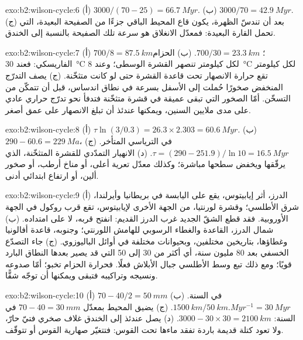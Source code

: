 \begin{solution}{exo:b2:wilson-cycle:6}
(أ) $3000/(70 - 25) = \qty{66.7}{Myr}$. (ب) $3000/70 = \qty{42.9}{Myr}$. (ج) بعد أن تندسّ
الظهرة، يكون قاع المحيط الباقي جزءًا من الصفيحة البعيدة، التي تحمل القارة
البعيدة: فمعدّل الانغلاق هو سرعة تلك الصفيحة بالنسبة إلى الخندق.
\end{solution}

\begin{solution}{exo:b2:wilson-cycle:7}
(أ) $700/8 = \qty{87.5}{km}$؛ $700/30 = \qty{23.3}{km}$. (ب) الحزام الفاريسكي: فعند
\qty{30}{\celsius} لكل كيلومتر تنصهر القشرة الوسطى؛ وعند \qty{8}{\celsius} لكل كيلومتر
تقع حرارة الانصهار تحت قاعدة القشرة حتى لو كانت متثخّنة. (ج) يصف التدرّج المنخفض
صخورًا حُملت إلى الأسفل بسرعة في نطاق اندساس، قبل أن تتمكّن من التسخّن. أمّا الصخور التي
تبقى عميقة في قشرة متثخّنة فتدفأ نحو تدرّج حراري عادي على مدى ملايين السنين، ويمكنها
عندئذ أن تبلغ الانصهار على عمق أصغر.
\end{solution}

\begin{solution}{exo:b2:wilson-cycle:8}
(أ) $\tau\ln(3/0.3) = 26.3\times2.303 = \qty{60.6}{Myr}$. (ب) $290 - 60.6 = \qty{229}{Ma}$، في
الترياسي المتأخر. (ج) $\tau = (290 - 251.9)/\ln10 = \qty{16.5}{Myr}$. (د) الانهيار
التمدّدي للقشرة المتثخّنة، الذي يرقّقها ويخفض سطحها مباشرة؛ وكذلك
معدّل تعرية أعلى، أو مناخ أرطب، أو صخور ألين، أو ارتفاع ابتدائي أدنى.
\end{solution}

\begin{solution}{exo:b2:wilson-cycle:9}
(أ) الدرز، أثر إيابيتوس، يقع على اليابسة في بريطانيا وأيرلندا، شرق
الأطلسي؛ وقشرة لورنتيا، من الجهة الأخرى لإيابيتوس، تقع قرب روكول في
الجهة الأوروبية. فقد قطع الشقّ الجديد غرب الدرز القديم: انفتح قربه، لا على امتداده.
(ب) شمال الدرز، القاعدة والغطاء الرسوبي للهامش اللورنتي؛ وجنوبه، قاعدة
أفالونيا وغطاؤها، بتاريخين مختلفين، وبحيوانات مختلفة في أوائل الباليوزوي. (ج) جاء التصدّع الخسفي
بعد 80 مليون سنة، أي أكثر من 30 إلى 50 التي قد يصير بعدها النطاق البارد
قويًا؛ ومع ذلك تبع وسط الأطلسي جبال الأبلاش فعلًا. فحرارة الحزام تخبو؛ أمّا
صدوعه ونسيجه وتراكيبه فتبقى ويمكنها أن توجّه شقًّا.
\end{solution}

\begin{solution}{exo:b2:wilson-cycle:10}
(أ) $70 - 40/2 = \qty{50}{mm}$ في السنة. (ب) $\qty{1500}{km}/\qty{50}{km.Myr^{-1}} =
\qty{30}{Myr}$. (ج) يضيق المحيط بمعدّل $70 - 40 = \qty{30}{mm}$ في السنة: $3000 - 30\times30 =
\qty{2100}{km}$. (د) يصل عندئذ إلى الخندق غلاف صخري فتيّ حارّ، ولا تعود كتلة قديمة باردة
تفقد ماءها تحت القوس: فتتغيّر صهارية القوس أو تتوقّف.
\end{solution}

